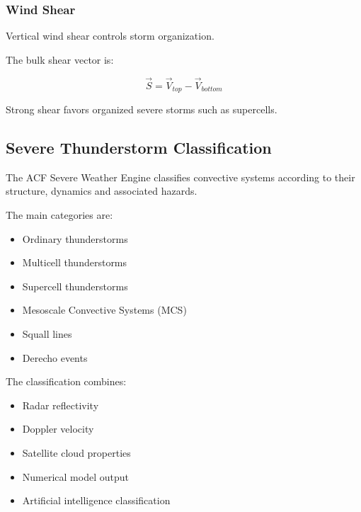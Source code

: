 
\subsubsection{Wind Shear}

Vertical wind shear controls storm organization.

The bulk shear vector is:

\[
\vec{S}
=
\vec{V}_{top}
-
\vec{V}_{bottom}
\]

Strong shear favors organized severe storms such as supercells.

\subsection{Severe Thunderstorm Classification}

The ACF Severe Weather Engine classifies convective systems according to
their structure, dynamics and associated hazards.

The main categories are:

\begin{itemize}

\item Ordinary thunderstorms

\item Multicell thunderstorms

\item Supercell thunderstorms

\item Mesoscale Convective Systems (MCS)

\item Squall lines

\item Derecho events

\end{itemize}

The classification combines:

\begin{itemize}

\item Radar reflectivity

\item Doppler velocity

\item Satellite cloud properties

\item Numerical model output

\item Artificial intelligence classification

\end{itemize}

